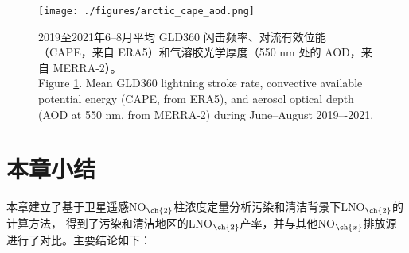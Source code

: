 \begin{figure}[H]
\centering
\texttt{[image: ./figures/arctic\_cape\_aod.png]}
\caption{
2019至2021年6--8月平均 GLD360 闪击频率、对流有效位能（CAPE，来自 ERA5）和气溶胶光学厚度（550 nm 处的 AOD，来自 MERRA-2）。\\
Figure \ref{fig:arctic_cape_aod}.
Mean GLD360 lightning stroke rate, convective available potential energy (CAPE, from ERA5), and aerosol optical depth (AOD at 550 nm, from MERRA-2) during June--August 2019–-2021.
}
\label{fig:arctic_cape_aod}
\end{figure}



\section{本章小结}

本章建立了基于卫星遥感NO$_{\ch{2}}$柱浓度定量分析污染和清洁背景下LNO$_{\ch{2}}$的计算方法，
得到了污染和清洁地区的LNO$_{\ch{2}}$产率，并与其他NO$_{\ch{x}}$排放源进行了对比。主要结论如下：

